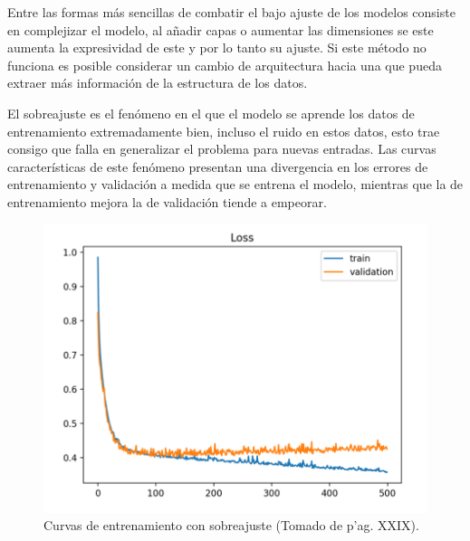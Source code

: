 Entre las formas más sencillas de combatir el bajo ajuste de los modelos consiste en complejizar el modelo, al añadir
capas o aumentar las dimensiones se este aumenta la expresividad de este y por lo tanto su ajuste. Si este método 
no funciona es posible considerar un cambio de arquitectura hacia una que pueda extraer más información de la 
estructura de los datos. 

El sobreajuste es el fenómeno en el que el modelo se aprende los datos de entrenamiento extremadamente bien, incluso
el ruido en estos datos, esto trae consigo que falla en generalizar el problema para nuevas entradas. Las curvas 
características de este fenómeno presentan una divergencia en los errores de entrenamiento y validación a medida
que se entrena el modelo, mientras que la de entrenamiento mejora la de validación tiende a empeorar. 

\begin{figure}[h!]
	\begin{center}
		\begin{center}
			\includegraphics[scale=.3]{Graphics/overfit_raising_val_error.png}
        \end{center}
	    \caption{Curvas de entrenamiento con sobreajuste (Tomado de \cite{brownlee2018better} p'ag. XXIX).}\label{fig:overfit}
	\end{center}
\end{figure}

